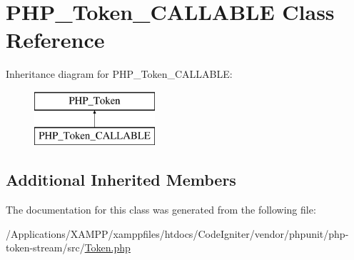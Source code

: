 \hypertarget{class_p_h_p___token___c_a_l_l_a_b_l_e}{}\section{P\+H\+P\+\_\+\+Token\+\_\+\+C\+A\+L\+L\+A\+B\+LE Class Reference}
\label{class_p_h_p___token___c_a_l_l_a_b_l_e}
Inheritance diagram for P\+H\+P\+\_\+\+Token\+\_\+\+C\+A\+L\+L\+A\+B\+LE\+:\begin{figure}[H]
\begin{center}
\leavevmode
\includegraphics[height=2.000000cm]{class_p_h_p___token___c_a_l_l_a_b_l_e}
\end{center}
\end{figure}
\subsection*{Additional Inherited Members}


The documentation for this class was generated from the following file\+:\begin{DoxyCompactItemize}
\item 
/\+Applications/\+X\+A\+M\+P\+P/xamppfiles/htdocs/\+Code\+Igniter/vendor/phpunit/php-\/token-\/stream/src/\mbox{\hyperlink{_token_8php}{Token.\+php}}\end{DoxyCompactItemize}
